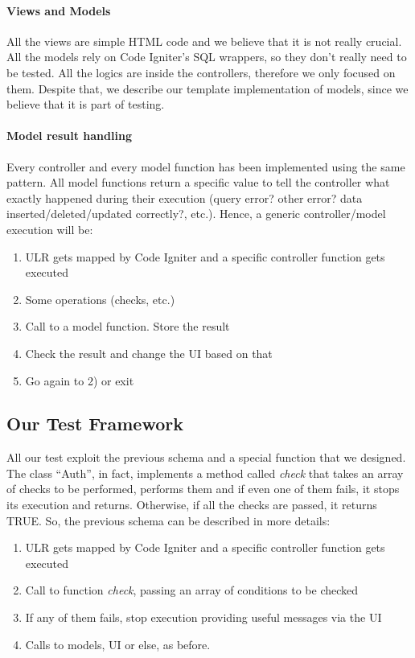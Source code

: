 \paragraph{Views and Models}
All the views are simple HTML code and we believe that it is not really crucial. All the models rely on Code Igniter's SQL wrappers, so they don't really need to be tested. All the logics are inside the controllers, therefore we only focused on them. Despite that, we describe our template implementation of models, since we believe that it is part of testing.

\paragraph{Model result handling}
Every controller and every model function has been implemented using the same pattern. All model functions return a specific value to tell the controller what exactly happened during their execution (query error? other error? data inserted/deleted/updated correctly?, etc.). Hence, a generic controller/model execution will be:
\begin{enumerate}
\item ULR gets mapped by Code Igniter and a specific controller function gets executed
\item Some operations (checks, etc.)
\item Call to a model function. Store the result
\item Check the result and change the UI based on that
\item Go again to 2) or exit
\end{enumerate}

\subsection{Our Test Framework}
All our test exploit the previous schema and a special function that we designed. The class ``Auth'', in fact, implements a method called \emph{check} that takes an array of checks to be performed, performs them and if even one of them fails, it stops its execution and returns. Otherwise, if all the checks are passed, it returns TRUE. So, the previous schema can be described in more details:
\begin{enumerate}
\item ULR gets mapped by Code Igniter and a specific controller function gets executed
\item Call to function \emph{check}, passing an array of conditions to be checked
\item If any of them fails, stop execution providing useful messages via the UI
\item Calls to models, UI or else, as before.
\end{enumerate}

